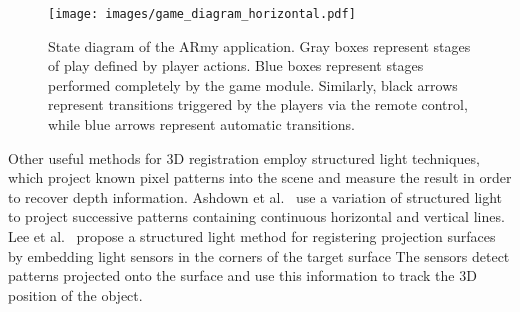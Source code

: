 \documentclass[review]{vgtc}                 %
\begin{document}
\begin{figure}[t]
\begin{center}
\texttt{[image: images/game\_diagram\_horizontal.pdf]}
\end{center}
\vspace*{-0.15in}
\caption[ARmy Application State Diagram]{State diagram of the
    ARmy application.  Gray boxes represent stages of play defined by
    player actions.  Blue boxes represent stages performed completely
    by the game module.  Similarly, black arrows represent transitions
    triggered by the players via the remote control, while blue arrows
    represent automatic transitions.}
\label{FIGURE:ARmyDiagram}
\vspace{-0.1in}
\end{figure}



Other useful methods for 3D registration employ structured light
techniques, which project known pixel patterns into the scene and
measure the result in order to recover depth information.  Ashdown et
al.~\cite{Ashdown2004} use a variation of structured light to project
successive patterns containing continuous horizontal and vertical
lines.  
Lee et al.~\cite{Lee2004} propose a structured light method for
registering projection surfaces 
by embedding light sensors in the corners of the target surface
The sensors detect patterns projected onto the surface and
use this information to track the 3D position of the object.


\end{document}
